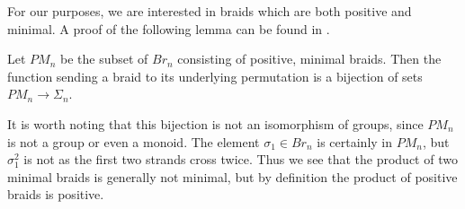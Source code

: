 \documentclass{amsbook} %
\numberwithin{section}{chapter}
\begin{document}
For our purposes, we are interested in braids which are both positive and minimal.  A proof of the following lemma can be found in \cite{EM2}.

\begin{lem}\label{pmlem}
Let $PM_{n}$ be the subset of $Br_{n}$ consisting of positive, minimal braids.  Then the function sending a braid to its underlying permutation is a bijection of sets $PM_{n} \rightarrow \Sigma_{n}$.
\end{lem}

\begin{rem}\label{pmrem}
It is worth noting that this bijection is not an isomorphism of groups, since $PM_{n}$ is not a group or even a monoid.  The element $\sigma_{1} \in Br_{n}$ is certainly in $PM_{n}$, but $\sigma_{1}^{2}$ is not as the first two strands cross twice.  Thus we see that the product of two minimal braids is generally not minimal, but by definition the product of positive braids is positive.
\end{rem}
\end{document}

